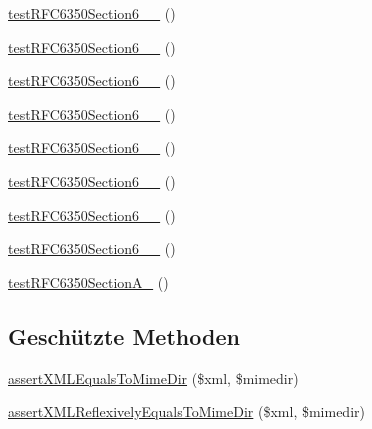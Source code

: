 \begin{DoxyCompactItemize}
\item 
\mbox{\hyperlink{class_sabre_1_1_v_object_1_1_parser_1_1_xml_test_a774698bffe3b4d61116363e64543c1a8}{test\+R\+F\+C6350\+Section6\+\_\+\_}} ()
\item 
\mbox{\hyperlink{class_sabre_1_1_v_object_1_1_parser_1_1_xml_test_a53fe21aefb6e0819fbd0583eb066e5be}{test\+R\+F\+C6350\+Section6\+\_\+\_}} ()
\item 
\mbox{\hyperlink{class_sabre_1_1_v_object_1_1_parser_1_1_xml_test_a65ff5947fee564bcdfd545241842f217}{test\+R\+F\+C6350\+Section6\+\_\+\_}} ()
\item 
\mbox{\hyperlink{class_sabre_1_1_v_object_1_1_parser_1_1_xml_test_abbcb1fd3ddfe5566c790803712a7483e}{test\+R\+F\+C6350\+Section6\+\_\+\_}} ()
\item 
\mbox{\hyperlink{class_sabre_1_1_v_object_1_1_parser_1_1_xml_test_a15a5618737476017128e3abbdc2ab861}{test\+R\+F\+C6350\+Section6\+\_\+\_}} ()
\item 
\mbox{\hyperlink{class_sabre_1_1_v_object_1_1_parser_1_1_xml_test_a527c17bcedfac1a1b17598a9950328bf}{test\+R\+F\+C6350\+Section6\+\_\+\_}} ()
\item 
\mbox{\hyperlink{class_sabre_1_1_v_object_1_1_parser_1_1_xml_test_aa01b04a27b5446fd9d7dfbd691eb582c}{test\+R\+F\+C6350\+Section6\+\_\+\_}} ()
\item 
\mbox{\hyperlink{class_sabre_1_1_v_object_1_1_parser_1_1_xml_test_a275173f6d99d33e7637800e28015ffc6}{test\+R\+F\+C6350\+Section6\+\_\+\_}} ()
\item 
\mbox{\hyperlink{class_sabre_1_1_v_object_1_1_parser_1_1_xml_test_a6fd2b308138fe13f137a90559f975029}{test\+R\+F\+C6350\+Section\+A\+\_}} ()
\end{DoxyCompactItemize}
\subsection*{Geschützte Methoden}
\begin{DoxyCompactItemize}
\item 
\mbox{\hyperlink{class_sabre_1_1_v_object_1_1_parser_1_1_xml_test_a0bddb62435897bef4ca700d004211fc9}{assert\+X\+M\+L\+Equals\+To\+Mime\+Dir}} (\$xml, \$mimedir)
\item 
\mbox{\hyperlink{class_sabre_1_1_v_object_1_1_parser_1_1_xml_test_a858366f8680b5a8e6cf3e9f05f237e02}{assert\+X\+M\+L\+Reflexively\+Equals\+To\+Mime\+Dir}} (\$xml, \$mimedir)
\end{DoxyCompactItemize}


